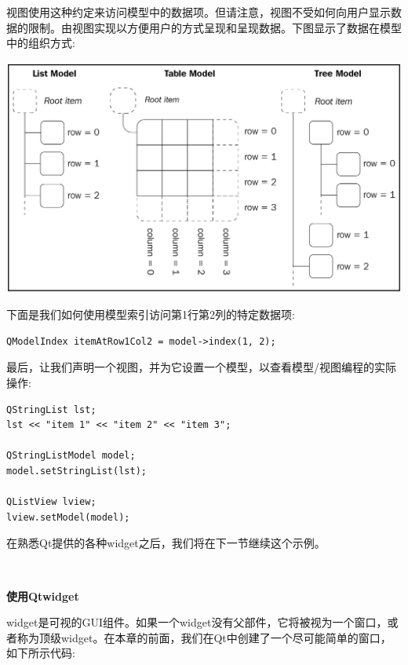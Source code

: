 视图使用这种约定来访问模型中的数据项。但请注意，视图不受如何向用户显示数据的限制。由视图实现以方便用户的方式呈现和呈现数据。下图显示了数据在模型中的组织方式: \par

\begin{center}
	\includegraphics[width=1.0\textwidth]{content/Section-2/Chapter-14/11}
\end{center}

下面是我们如何使用模型索引访问第1行第2列的特定数据项: \par

\begin{lstlisting}[caption={}]
QModelIndex itemAtRow1Col2 = model->index(1, 2);
\end{lstlisting}

最后，让我们声明一个视图，并为它设置一个模型，以查看模型/视图编程的实际操作: \par

\begin{lstlisting}[caption={}]
QStringList lst;
lst << "item 1" << "item 2" << "item 3";

QStringListModel model;
model.setStringList(lst);

QListView lview;
lview.setModel(model);
\end{lstlisting}

在熟悉Qt提供的各种widget之后，我们将在下一节继续这个示例。 \par

\noindent\textbf{}\ \par
\textbf{使用Qtwidget} \ \par
widget是可视的GUI组件。如果一个widget没有父部件，它将被视为一个窗口，或者称为顶级widget。在本章的前面，我们在Qt中创建了一个尽可能简单的窗口，如下所示代码: \par

